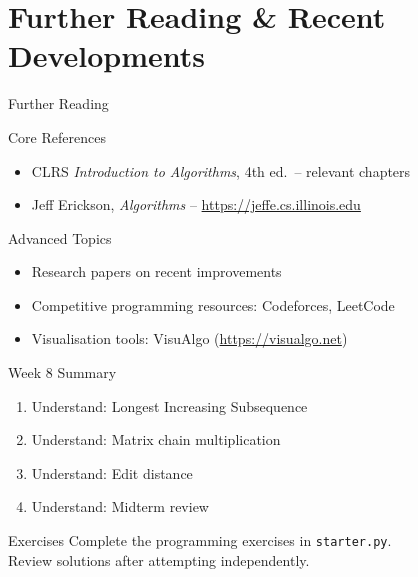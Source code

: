 \documentclass[aspectratio=169,xcolor=dvipsnames]{beamer}
\begin{document}
\section{Further Reading \& Recent Developments}
\begin{frame}{Further Reading}
  \begin{block}{Core References}
    \begin{itemize}
      \item CLRS \textit{Introduction to Algorithms}, 4th ed.\ -- relevant chapters
      \item Jeff Erickson, \textit{Algorithms} -- \url{https://jeffe.cs.illinois.edu}
    \end{itemize}
  \end{block}
  \begin{exampleblock}{Advanced Topics}
    \begin{itemize}
      \item Research papers on recent improvements
      \item Competitive programming resources: Codeforces, LeetCode
      \item Visualisation tools: VisuAlgo (\url{https://visualgo.net})
    \end{itemize}
  \end{exampleblock}
\end{frame}

\begin{frame}{Week 8 Summary}
  \begin{enumerate}
    \item Understand: Longest Increasing Subsequence
    \item Understand: Matrix chain multiplication
    \item Understand: Edit distance
    \item Understand: Midterm review
  \end{enumerate}
  \begin{block}{Exercises}
    Complete the programming exercises in \texttt{starter.py}.\\
    Review solutions after attempting independently.
  \end{block}
\end{frame}
\end{document}
